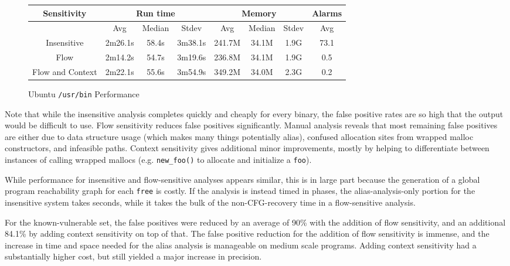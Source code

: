 \begin{figure*}
	\begin{center}
	\begin{tabular}{|c||c|c|c||c|c|c||c|}
		\hline
		Sensitivity & \multicolumn{3}{c||}{Run time} & \multicolumn{3}{c||}{Memory} & Alarms \\
		\hline
		& Avg & Median & Stdev & Avg & Median & Stdev  &Avg\\
		\hline\hline
		Insensitive  & 2m26.1s & 58.4s & 3m38.1s & 241.7M & 34.1M & 1.9G & 73.1\\ \hline
		Flow & 2m14.2s & 54.7s & 3m19.6s & 236.8M & 34.1M & 1.9G & 0.5 \\ \hline
		Flow and Context  & 2m22.1s & 55.6s & 3m54.9s & 349.2M & 34.0M & 2.3G & 0.2 \\ \hline
	\end{tabular}
	\end{center}
	\caption{Ubuntu \texttt{/usr/bin} Performance}
	\label{fig:ubperf}
\end{figure*}

Note that while the insensitive analysis completes quickly and cheaply for every binary, the false positive rates are so high that the output would be difficult to use.
Flow sensitivity reduces false positives significantly.
Manual analysis reveals that most remaining false positives are either due to data structure usage (which makes many things potentially alias), confused allocation sites from wrapped malloc constructors, and infeasible paths.
Context sensitivity gives additional minor improvements, mostly by helping to differentiate between instances of calling wrapped mallocs (e.g. \texttt{new\_foo()} to allocate and initialize a \texttt{foo}).

While performance for insensitive and flow-sensitive analyses appears similar, this is in large part because the generation of a global program reachability graph for each \texttt{free} is costly.
If the analysis is instead timed in phases, the alias-analysis-only portion for the insensitive system takes seconds, while it takes the bulk of the non-CFG-recovery time in a flow-sensitive analysis.

For the known-vulnerable set, the false positives were reduced by an average of 90\% with the addition of flow sensitivity, and an additional 84.1\% by adding context sensitivity on top of that.
The false positive reduction for the addition of flow sensitivity is immense, and the increase in time and space needed for the alias analysis is manageable on medium scale programs.
Adding context sensitivity had a substantially higher cost, but still yielded a major increase in precision.

